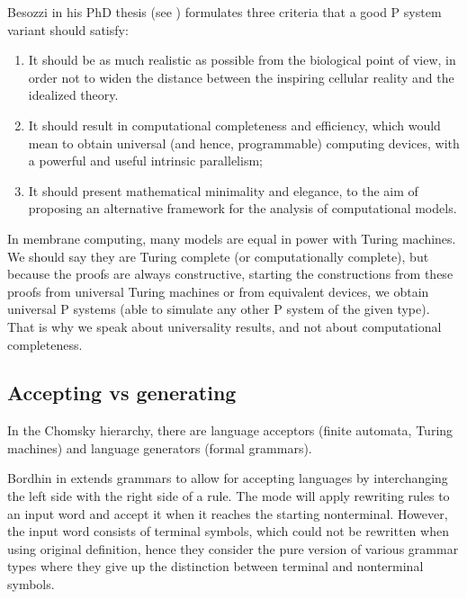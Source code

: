 Besozzi in his PhD thesis (see \cite{Besozzi:PhD:2004}) formulates three criteria that a good P system variant should satisfy:

\begin{enumerate}
	\item It should be as much realistic as possible from the biological point of view, in order not to widen the distance between the inspiring cellular reality and the idealized theory.
	\item It should result in computational completeness and efficiency, which would mean to obtain universal (and hence, programmable) computing devices, with a powerful and useful intrinsic parallelism;
	\item It should present mathematical minimality and elegance, to the aim of proposing an alternative framework for the analysis of computational models.
\end{enumerate}

In membrane computing, many models are equal in power with Turing machines. We should say they are Turing complete (or computationally complete), but because the proofs are always constructive, starting the constructions from these proofs from universal Turing machines or from equivalent devices, we obtain universal P systems (able
to simulate any other P system of the given type). That is why we speak about universality results, and not about computational completeness.

\subsection{Accepting vs generating} %
\label{sub:accepting_vs_generating}

In the Chomsky hierarchy, there are language acceptors (finite automata, Turing machines) and language generators (formal grammars).


Bordhin in \cite{Bordihn99acceptingpure} extends grammars to allow for accepting languages by interchanging the left side with the right side of a rule. The mode will apply rewriting rules to an input word and accept it when it reaches the starting nonterminal. However, the input word consists of terminal symbols, which could not be rewritten when using original definition, hence they consider the pure version of various grammar types where they give up the distinction between terminal and nonterminal symbols.


